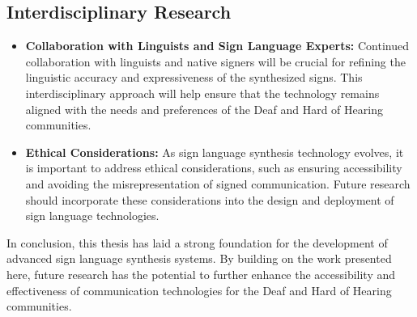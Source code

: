 \documentclass[../../main.tex]{subfiles}
\begin{document}
\subsection{Interdisciplinary Research}

\begin{itemize}
    \item \textbf{Collaboration with Linguists and Sign Language Experts:} Continued collaboration with linguists and native signers will be crucial for refining the linguistic accuracy and expressiveness of the synthesized signs. This interdisciplinary approach will help ensure that the technology remains aligned with the needs and preferences of the Deaf and Hard of Hearing communities.
    
    \item \textbf{Ethical Considerations:} As sign language synthesis technology evolves, it is important to address ethical considerations, such as ensuring accessibility and avoiding the misrepresentation of signed communication. Future research should incorporate these considerations into the design and deployment of sign language technologies.
\end{itemize}

In conclusion, this thesis has laid a strong foundation for the development of advanced sign language synthesis systems. By building on the work presented here, future research has the potential to further enhance the accessibility and effectiveness of communication technologies for the Deaf and Hard of Hearing communities.
\end{document}
